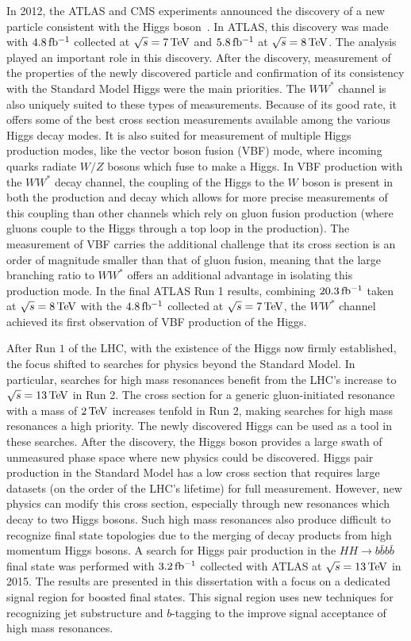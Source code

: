 In 2012, the ATLAS and CMS experiments announced the discovery of a new particle consistent with the Higgs boson~\cite{Discovery,CMSDiscovery}. In ATLAS, this discovery was made with $4.8 \mbox{\,fb$^{-1}$}$ collected at $\sqrt{s} = 7 \TeV$ and $5.8 \mbox{\,fb$^{-1}$}$ at $\sqrt{s} = 8 \TeV$. The \HWWfull analysis played an important role in this discovery. After the discovery, measurement of the properties of the newly discovered particle and confirmation of its consistency with the Standard Model Higgs were the main priorities. The $WW^*$ channel is also uniquely suited to these types of measurements. Because of its good rate, it offers some of the best cross section measurements available among the various Higgs decay modes. It is also suited for measurement of multiple Higgs production modes, like the vector boson fusion (VBF) mode, where incoming quarks radiate $W/Z$ bosons which fuse to make a Higgs. In VBF production with the $WW^*$ decay channel, the coupling of the Higgs to the $W$ boson is present in both the production and decay which allows for more precise measurements of this coupling than other channels which rely on gluon fusion production (where gluons couple to the Higgs through a top loop in the production). The measurement of VBF carries the additional challenge that its cross section is an order of magnitude smaller than that of gluon fusion, meaning that the large branching ratio to $WW^*$ offers an additional advantage in isolating this production mode. In the final ATLAS Run 1 results, combining $20.3 \mbox{\,fb$^{-1}$}$ taken at $\sqrt{s} = 8 \TeV$ with the $4.8 \mbox{\,fb$^{-1}$}$ collected at $\sqrt{s} = 7 \TeV$, the $WW^*$ channel achieved its first observation of VBF production of the Higgs.

After Run $1$ of the LHC, with the existence of the Higgs now firmly established, the focus shifted to searches for physics beyond the Standard Model. In particular, searches for high mass resonances benefit from the LHC's increase to $\sqrt{s} = 13 \TeV$ in Run 2. The cross section for a generic gluon-initiated resonance with a mass of $2 \TeV$ increases tenfold in Run 2, making searches for high mass resonances a high priority. The newly discovered Higgs can be used as a tool in these searches. After the discovery, the Higgs boson provides a large swath of unmeasured phase space where new physics could be discovered. Higgs pair production in the Standard Model has a low cross section that requires large datasets (on the order of the LHC's lifetime) for full measurement. However, new physics can modify this cross section, especially through new resonances which decay to two Higgs bosons. Such high mass resonances also produce difficult to recognize final state topologies due to the merging of decay products from high momentum Higgs bosons. A search for Higgs pair production in the $HH\to b\bar{b}b\bar{b}$ final state was performed with $3.2 \mbox{\,fb$^{-1}$}$ collected with ATLAS at $\sqrt{s} = 13 \TeV$ in 2015. The results are presented in this dissertation with a focus on a dedicated signal region for boosted final states. This signal region uses new techniques for recognizing jet substructure and $b$-tagging to the improve signal acceptance of high mass resonances. 

